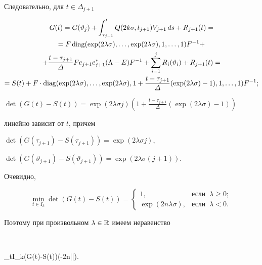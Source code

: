 Следовательно, для $t\in\varDelta_{j+1}$


\begin{multline*}


G(t)=G(\vartheta_j)+\int_{\tau_{j+1}}^{t}Q(2k\sigma,t_{j+1})V_{j+1}\,ds


+R_{j+1}(t)=\\


%


=F\diag(\exp(2\lambda\sigma),\dotsc,\exp(2\lambda\sigma),1,\dotsc,1) F^{-1}+\\


%


+\frac{t-\tau_{j+1}}{\varDelta}Fe_{j+1}e^*_{j+1}(\Lambda-E)F^{-1}+


\sum_{i=1}^{j}R_i(\vartheta_i)+R_{j+1}(t)=\\


%


=S(t)+F\cdot\diag(\exp(2\lambda\sigma),\dotsc,\exp(2\lambda\sigma),


1+\frac{t-\tau_{j+1}}{\varDelta}(\exp(2\lambda\sigma)-1),1,\dotsc,1)F^{-1};


\end{multline*}


$\det(G(t)-S(t))=\exp(2\lambda\sigma j)


\left(1+\frac{t-\tau_{j+1}}{\varDelta}(\exp(2\lambda\sigma)-1)\right)$


линейно зависит от $t$, причем


$\det(G(\tau_{j+1})-S(\tau_{j+1}))=\exp(2\lambda\sigma j)$,


$\det(G(\vartheta_{j+1})-S(\vartheta_{j+1}))=\exp(2\lambda\sigma (j+1))$.


Очевидно,


$$


\min_{t\in I_{k}}\det(G(t)-S(t))=


\begin{cases}


1, & \text{если }\ \lambda\ge 0;\\


\exp(2n\lambda\sigma), & \text{если }\ \lambda<0.


\end{cases}


$$


Поэтому при произвольном $\lambda\in\Bbb R$ имеем неравенство


$$


\min_{t\in I_{k}}\det(G(t)-S(t))\ge\exp(-2n|\lambda|\sigma).



